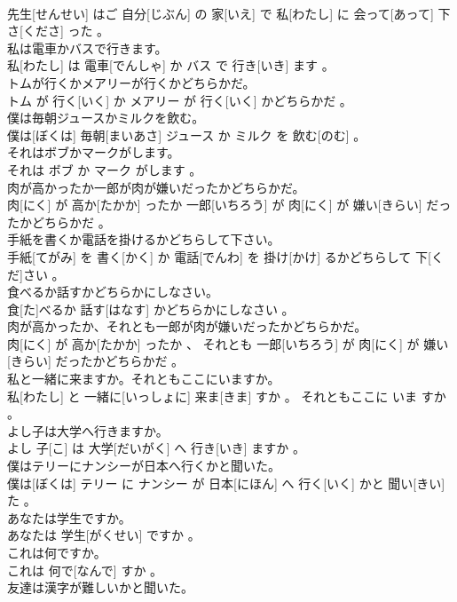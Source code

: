 \documentclass[8pt]{extreport}
\begin{document}
\begin{CJK}{UTF8}{min}
\\	先生[せんせい] はご 自分[じぶん] の 家[いえ] で 私[わたし] に 会って[あって] 下さ[くださ] った 。
\\	私は電車かバスで行きます。	
\\	私[わたし] は 電車[でんしゃ] か バス で 行き[いき] ます 。
\\	トムが行くかメアリーが行くかどちらかだ。	
\\	トム が 行く[いく] か メアリー が 行く[いく] かどちらかだ 。
\\	僕は毎朝ジュースかミルクを飲む。	
\\	僕は[ぼくは] 毎朝[まいあさ] ジュース か ミルク を 飲む[のむ] 。
\\	それはボブかマークがします。	
\\	それは ボブ か マーク がします 。
\\	肉が高かったか一郎が肉が嫌いだったかどちらかだ。	
\\	肉[にく] が 高か[たかか] ったか 一郎[いちろう] が 肉[にく] が 嫌い[きらい] だったかどちらかだ 。
\\	手紙を書くか電話を掛けるかどちらして下さい。	
\\	手紙[てがみ] を 書く[かく] か 電話[でんわ] を 掛け[かけ] るかどちらして 下[くだ]さい 。
\\	食べるか話すかどちらかにしなさい。	
\\	食[た]べるか 話す[はなす] かどちらかにしなさい 。
\\	肉が高かったか、それとも一郎が肉が嫌いだったかどちらかだ。	
\\	肉[にく] が 高か[たかか] ったか 、 それとも 一郎[いちろう] が 肉[にく] が 嫌い[きらい] だったかどちらかだ 。
\\	私と一緒に来ますか。それともここにいますか。	
\\	私[わたし] と 一緒に[いっしょに] 来ま[きま] すか 。 それともここに いま すか 。
\\	よし子は大学へ行きますか。	
\\	よし 子[こ] は 大学[だいがく] へ 行き[いき] ますか 。
\\	僕はテリーにナンシーが日本へ行くかと聞いた。	
\\	僕は[ぼくは] テリー に ナンシー が 日本[にほん] へ 行く[いく] かと 聞い[きい] た 。
\\	あなたは学生ですか。	
\\	あなたは 学生[がくせい] ですか 。
\\	これは何ですか。	
\\	これは 何で[なんで] すか 。
\\	友達は漢字が難しいかと聞いた。	

\end{CJK}
\end{document}
